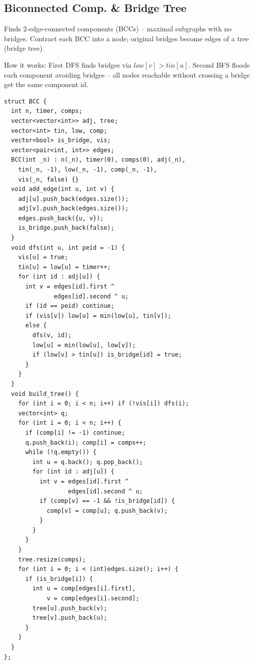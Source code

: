 \subsection{Biconnected Comp. \texorpdfstring{\&}{&} Bridge Tree}
Finds 2-edge-connected components (BCCs) -- maximal subgraphs with no bridges. Contract each BCC into a node; original bridges become edges of a tree (bridge tree).

How it works: First DFS finds bridges via $low[v] > tin[u]$. Second BFS floods each component avoiding bridges -- all nodes reachable without crossing a bridge get the same component id.
\begin{verbatim}
struct BCC {
  int n, timer, comps;
  vector<vector<int>> adj, tree;
  vector<int> tin, low, comp;
  vector<bool> is_bridge, vis;
  vector<pair<int, int>> edges;
  BCC(int _n) : n(_n), timer(0), comps(0), adj(_n),
    tin(_n, -1), low(_n, -1), comp(_n, -1),
    vis(_n, false) {}
  void add_edge(int u, int v) {
    adj[u].push_back(edges.size());
    adj[v].push_back(edges.size());
    edges.push_back({u, v});
    is_bridge.push_back(false);
  }
  void dfs(int u, int peid = -1) {
    vis[u] = true;
    tin[u] = low[u] = timer++;
    for (int id : adj[u]) {
      int v = edges[id].first ^
              edges[id].second ^ u;
      if (id == peid) continue;
      if (vis[v]) low[u] = min(low[u], tin[v]);
      else {
        dfs(v, id);
        low[u] = min(low[u], low[v]);
        if (low[v] > tin[u]) is_bridge[id] = true;
      }
    }
  }
  void build_tree() {
    for (int i = 0; i < n; i++) if (!vis[i]) dfs(i);
    vector<int> q;
    for (int i = 0; i < n; i++) {
      if (comp[i] != -1) continue;
      q.push_back(i); comp[i] = comps++;
      while (!q.empty()) {
        int u = q.back(); q.pop_back();
        for (int id : adj[u]) {
          int v = edges[id].first ^
                  edges[id].second ^ u;
          if (comp[v] == -1 && !is_bridge[id]) {
            comp[v] = comp[u]; q.push_back(v);
          }
        }
      }
    }
    tree.resize(comps);
    for (int i = 0; i < (int)edges.size(); i++) {
      if (is_bridge[i]) {
        int u = comp[edges[i].first],
            v = comp[edges[i].second];
        tree[u].push_back(v);
        tree[v].push_back(u);
      }
    }
  }
};
\end{verbatim}
